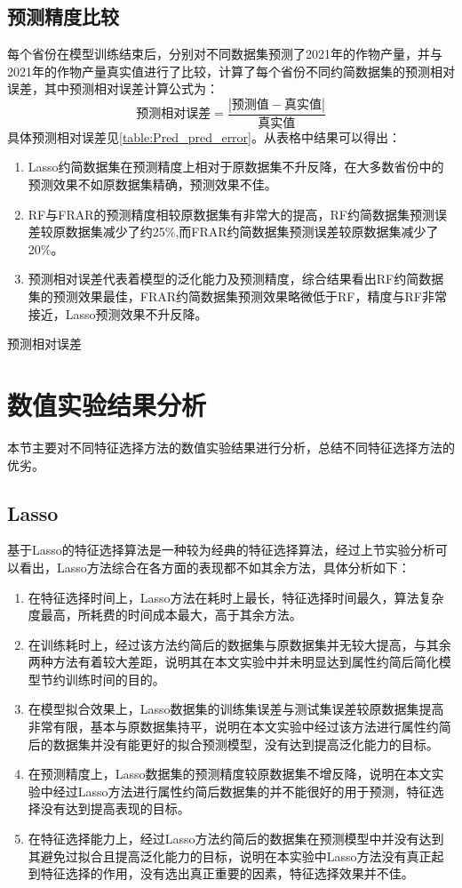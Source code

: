 \subsection{预测精度比较}
每个省份在模型训练结束后，分别对不同数据集预测了2021年的作物产量，并与2021年的作物产量真实值进行了比较，计算了每个省份不同约简数据集的预测相对误差，其中预测相对误差计算公式为：$$\text{预测相对误差}=\frac{\left|\text{预测值}-\text{真实值}\right|}{\text{真实值}}$$
具体预测相对误差见\ref{table:Pred_pred_error}。从表格中结果可以得出：
\begin{enumerate}
  \item Lasso约简数据集在预测精度上相对于原数据集不升反降，在大多数省份中的预测效果不如原数据集精确，预测效果不佳。
  \item RF与FRAR的预测精度相较原数据集有非常大的提高，RF约简数据集预测误差较原数据集减少了约25\%,而FRAR约简数据集预测误差较原数据集减少了20\%。
  \item 预测相对误差代表着模型的泛化能力及预测精度，综合结果看出RF约简数据集的预测效果最佳，FRAR约简数据集预测效果略微低于RF，精度与RF非常接近，Lasso预测效果不升反降。
\end{enumerate}
\begin{table}[htbp]
      \centering
      \caption{预测相对误差}
      \label{table:Pred_pred_error}
\end{table}
\section{数值实验结果分析}
本节主要对不同特征选择方法的数值实验结果进行分析，总结不同特征选择方法的优劣。
\subsection{Lasso}
基于Lasso的特征选择算法是一种较为经典的特征选择算法，经过上节实验分析可以看出，Lasso方法综合在各方面的表现都不如其余方法，具体分析如下：
\begin{enumerate}
  \item 在特征选择时间上，Lasso方法在耗时上最长，特征选择时间最久，算法复杂度最高，所耗费的时间成本最大，高于其余方法。
  \item 在训练耗时上，经过该方法约简后的数据集与原数据集并无较大提高，与其余两种方法有着较大差距，说明其在本文实验中并未明显达到属性约简后简化模型节约训练时间的目的。
  \item 在模型拟合效果上，Lasso数据集的训练集误差与测试集误差较原数据集提高非常有限，基本与原数据集持平，说明在本文实验中经过该方法进行属性约简后的数据集并没有能更好的拟合预测模型，没有达到提高泛化能力的目标。
  \item 在预测精度上，Lasso数据集的预测精度较原数据集不增反降，说明在本文实验中经过Lasso方法进行属性约简后数据集的并不能很好的用于预测，特征选择没有达到提高表现的目标。
  \item 在特征选择能力上，经过Lasso方法约简后的数据集在预测模型中并没有达到其避免过拟合且提高泛化能力的目标，说明在本实验中Lasso方法没有真正起到特征选择的作用，没有选出真正重要的因素，特征选择效果并不佳。
\end{enumerate}
